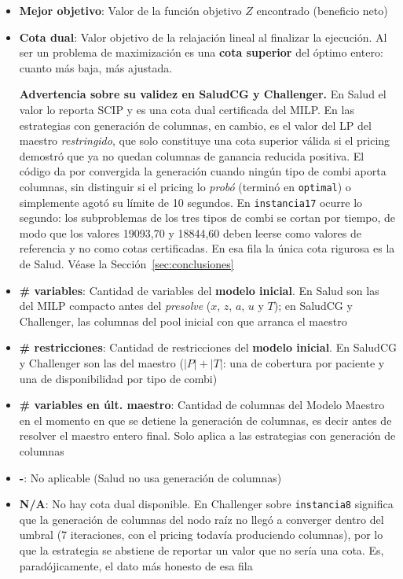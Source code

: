 \documentclass[12pt]{article}
\numberwithin{algorithm}{section}
\begin{document}
\begin{itemize}
    \item \textbf{Mejor objetivo}: Valor de la función objetivo $Z$ encontrado (beneficio neto)
    \item \textbf{Cota dual}: Valor objetivo de la relajación lineal al finalizar la ejecución. Al ser un problema de maximización es una \textbf{cota superior} del óptimo entero: cuanto más baja, más ajustada.

    \textbf{Advertencia sobre su validez en SaludCG y Challenger.} En Salud el valor lo reporta SCIP y es una cota dual certificada del MILP. En las estrategias con generación de columnas, en cambio, es el valor del LP del maestro \emph{restringido}, que solo constituye una cota superior válida si el pricing demostró que ya no quedan columnas de ganancia reducida positiva. El código da por convergida la generación cuando ningún tipo de combi aporta columnas, sin distinguir si el pricing lo \emph{probó} (terminó en \texttt{optimal}) o simplemente agotó su límite de 10 segundos. En \texttt{instancia17} ocurre lo segundo: los subproblemas de los tres tipos de combi se cortan por tiempo, de modo que los valores 19093{,}70 y 18844{,}60 deben leerse como valores de referencia y no como cotas certificadas. En esa fila la única cota rigurosa es la de Salud. Véase la Sección~\ref{sec:conclusiones}
    \item \textbf{\# variables}: Cantidad de variables del \textbf{modelo inicial}. En Salud son las del MILP compacto antes del \emph{presolve} ($x$, $z$, $a$, $u$ y $T$); en SaludCG y Challenger, las columnas del pool inicial con que arranca el maestro
    \item \textbf{\# restricciones}: Cantidad de restricciones del \textbf{modelo inicial}. En SaludCG y Challenger son las del maestro ($|P| + |T|$: una de cobertura por paciente y una de disponibilidad por tipo de combi)
    \item \textbf{\# variables en últ. maestro}: Cantidad de columnas del Modelo Maestro en el momento en que se detiene la generación de columnas, es decir antes de resolver el maestro entero final. Solo aplica a las estrategias con generación de columnas
    \item \textbf{-}: No aplicable (Salud no usa generación de columnas)
    \item \textbf{N/A}: No hay cota dual disponible. En Challenger sobre \texttt{instancia8} significa que la generación de columnas del nodo raíz no llegó a converger dentro del umbral (7 iteraciones, con el pricing todavía produciendo columnas), por lo que la estrategia se abstiene de reportar un valor que no sería una cota. Es, paradójicamente, el dato más honesto de esa fila
\end{itemize}
\end{document}
